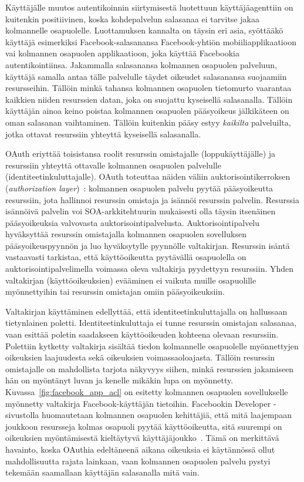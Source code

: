 \documentclass[finnish,gradu]{tktltiki}
\begin{document}
  Käyttäjälle muutos autentikoinnin siirtymisestä luotettuun käyttäjäagenttiin on kuitenkin positiivinen, koska kohdepalvelun salasanaa ei tarvitse jakaa kolmannelle osapuolelle. Luottamuksen kannalta on täysin eri asia, syöttääkö käyttäjä esimerkiksi Facebook-salasanansa Facebook-yhtiön mobiiliapplikaatioon vai kolmannen osapuolen applikaatioon, joka käyttää Facebookia autentikointiinsa. Jakammalla salasanansa kolmannen osapuolen palveluun, käyttäjä samalla antaa tälle palvelulle täydet oikeudet salasanansa suojaamiin resursseihin. Tällöin minkä tahansa kolmannen osapuolen tietomurto vaarantaa kaikkien niiden resurssien datan, joka on suojattu kyseisellä salasanalla. Tällöin käyttäjän ainoa keino poistaa kolmannen osapuolen pääsyoikeus jälkikäteen on oman salasanan vaihtaminen. Tällöin kuitenkin pääsy estyy \emph{kaikilta} palveluilta, jotka ottavat resurssiin yhteyttä kyseisellä salasanalla.

  OAuth eriyttää toisistansa roolit resurssin omistajalle (loppukäyttäjälle) ja resurssiin yhteyttä ottavalle kolmannen osapuolen palvelulle (identiteetinkuluttajalle). OAuth toteuttaa näiden väliin auktorisointikerroksen (\emph{authorization layer})~\cite{ietf_oauth2}: kolmannen osapuolen palvelu pyytää pääsyoikeutta resurssiin, jota hallinnoi resurssin omistaja ja isännöi resurssin palvelin. Resurssia isännöivä palvelin voi SOA-arkkitehtuurin mukaisesti olla täysin itsenäinen pääsyoikeuksia valvovasta auktorisointipalvelusta. Auktorisointipalvelu hyväksyttää resurssin omistajalla kolmannen osapuolen sovelluksen pääsyoikeuspyynnön ja luo hyväksytylle pyynnölle valtakirjan. Resurssin isäntä vastaavasti tarkistaa, että käyttöoikeutta pyytävällä osapuolella on auktorisointipalvelimella voimassa oleva valtakirja pyydettyyn resurssiin. Yhden valtakirjan (käyttöoikeuksien) evääminen ei vaikuta muille osapuolille myönnettyihin tai resurssin omistajan omiin pääsyoikeuksiin.

  Valtakirjan käyttäminen edellyttää, että identiteetinkuluttajalla on hallussaan tietynlainen poletti.   Identiteetinkuluttaja ei tunne resurssin omistajan salasanaa, vaan esittää poletin saadakseen käyttöoikeuden kohteena olevaan resurssiin. Polettiin kytketty valtakirja sisältää tiedon kolmannelle osapuolelle myönnettyjen oikeuksien laajuudesta sekä oikeuksien voimassaoloajasta. Tällöin resurssin omistajalle on mahdollista tarjota näkyvyys siihen, minkä resurssien jakamiseen hän on myöntänyt luvan ja kenelle mikäkin lupa on myönnetty. Kuvassa~\ref{fig:facebook_app_acl} on esitetty kolmannen osapuolen sovellukselle myönnetty valtakirja Facebook-käyttäjän tietoihin. Facebookin Developer -sivustolla huomautetaan kolmannen osapuolen kehittäjiä, että mitä laajempaan joukkoon resursseja kolmas osapuoli pyytää käyttöoikeutta, sitä suurempi on oikeuksien myöntämisestä kieltäytyvä käyttäjäjoukko~\cite{facebook_oauth2_doc}. Tämä on merkittävä havainto, koska OAuthia edeltäneenä aikana oikeuksia ei käytännössä ollut mahdollisuutta rajata lainkaan, vaan kolmannen osapuolen palvelu pystyi tekemään saamallaan käyttäjän salasanalla mitä vain.
\end{document}
